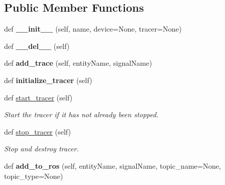 \subsection*{Public Member Functions}
\begin{DoxyCompactItemize}
\item 
def {\bfseries \+\_\+\+\_\+init\+\_\+\+\_\+} (self, name, device=None, tracer=None)\hypertarget{classrobot_1_1Robot_ad15eeb92007e66802fabd5ce42add7b0}{}\label{classrobot_1_1Robot_ad15eeb92007e66802fabd5ce42add7b0}

\item 
def {\bfseries \+\_\+\+\_\+del\+\_\+\+\_\+} (self)\hypertarget{classrobot_1_1Robot_a01b3eaee0bfc2251d32aceb7defb858b}{}\label{classrobot_1_1Robot_a01b3eaee0bfc2251d32aceb7defb858b}

\item 
def {\bfseries add\+\_\+trace} (self, entity\+Name, signal\+Name)\hypertarget{classrobot_1_1Robot_afe20b6b2c337dd9e0b4a53ed30c1a0cc}{}\label{classrobot_1_1Robot_afe20b6b2c337dd9e0b4a53ed30c1a0cc}

\item 
def {\bfseries initialize\+\_\+tracer} (self)\hypertarget{classrobot_1_1Robot_a1d39e4c3dd75c6c7592eeafe6596b773}{}\label{classrobot_1_1Robot_a1d39e4c3dd75c6c7592eeafe6596b773}

\item 
def \hyperlink{classrobot_1_1Robot_a3efb51e990f1e3292f321858e9a9723f}{start\+\_\+tracer} (self)\hypertarget{classrobot_1_1Robot_a3efb51e990f1e3292f321858e9a9723f}{}\label{classrobot_1_1Robot_a3efb51e990f1e3292f321858e9a9723f}

\begin{DoxyCompactList}\small\item\em Start the tracer if it has not already been stopped. \end{DoxyCompactList}\item 
def \hyperlink{classrobot_1_1Robot_ace42b97e31dcc38be3bd69b2ab33a214}{stop\+\_\+tracer} (self)\hypertarget{classrobot_1_1Robot_ace42b97e31dcc38be3bd69b2ab33a214}{}\label{classrobot_1_1Robot_ace42b97e31dcc38be3bd69b2ab33a214}

\begin{DoxyCompactList}\small\item\em Stop and destroy tracer. \end{DoxyCompactList}\item 
def {\bfseries add\+\_\+to\+\_\+ros} (self, entity\+Name, signal\+Name, topic\+\_\+name=None, topic\+\_\+type=None)\hypertarget{classrobot_1_1Robot_ac208f7eafdff6ad891e77402167e9ccc}{}\label{classrobot_1_1Robot_ac208f7eafdff6ad891e77402167e9ccc}


\end{DoxyCompactItemize}

